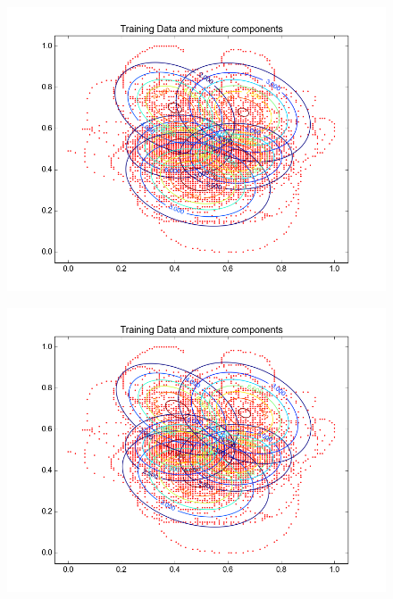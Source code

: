 \documentclass[11pt,a4paper]{article}
\begin{document}
\begin{minipage}[b]{0.25\textwidth}
\begin{figure}[H]
  \centering
  \includegraphics[width=.8\linewidth]{Figures/contours_a.test10.png}

  \label{fig:sfig1}
\end{figure}%
\end{minipage}
\begin{minipage}[b]{0.25\textwidth}
\begin{figure}[H]
  \centering
  \includegraphics[width=.8\linewidth]{Figures/contours_a.test15.png}
 \label{fig:sfig1}
\end{figure}%
\end{minipage}
\end{document}
